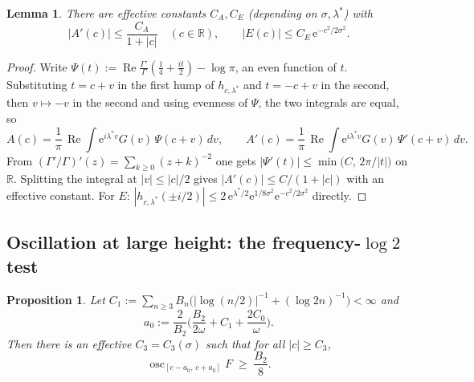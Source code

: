 \documentclass[11pt]{amsart}
\newtheorem{proposition}[theorem]{Proposition}
\newtheorem{lemma}[theorem]{Lemma}
\theoremstyle{definition}
\theoremstyle{remark}
\newcommand{\RR}{\mathbb{R}}
\newcommand{\eE}{\mathrm{e}}
\DeclareMathOperator{\Rre}{Re}
\DeclareMathOperator{\osc}{osc}
\begin{document}
\begin{lemma}\label{lem:AE}
There are effective constants $C_A,C_E$ (depending on $\sigma,\lambda^*$) with
\[
|A'(c)|\le \frac{C_A}{1+|c|}\quad(c\in\RR),\qquad
|E(c)|\le C_E\,\eE^{-c^2/2\sigma^2}.
\]
\end{lemma}

\begin{proof}
Write $\Psi(t):=\Rre\frac{\Gamma'}{\Gamma}(\tfrac14+\tfrac{it}{2})-\log\pi$, an even function of $t$. Substituting $t=c+v$ in the first hump of $h_{c,\lambda^*}$ and $t=-c+v$ in the second, then $v\mapsto-v$ in the second and using evenness of $\Psi$, the two integrals are equal, so
\[
A(c)=\frac1\pi\,\Rre\int \eE^{i\lambda^*v}G(v)\,\Psi(c+v)\,dv,
\qquad
A'(c)=\frac1\pi\,\Rre\int \eE^{i\lambda^*v}G(v)\,\Psi'(c+v)\,dv .
\]
From $(\Gamma'/\Gamma)'(z)=\sum_{k\ge0}(z+k)^{-2}$ one gets $|\Psi'(t)|\le\min\big(C,\,2\pi/|t|\big)$ on $\RR$. Splitting the integral at $|v|\le|c|/2$ gives $|A'(c)|\le C/(1+|c|)$ with an effective constant. For $E$: $|h_{c,\lambda^*}(\pm i/2)|\le2\,\eE^{\lambda^*/2}\eE^{1/8\sigma^2}\eE^{-c^2/2\sigma^2}$ directly.
\end{proof}

\subsection{Oscillation at large height: the frequency-$\log 2$ test}

\begin{proposition}\label{prop:largec}
Let $C_1:=\sum_{n\ge3}B_n\big(|\log(n/2)|^{-1}+(\log 2n)^{-1}\big)<\infty$ and
\[
a_0:=\frac{2}{B_2}\Big(\frac{B_2}{2\omega}+C_1+\frac{2C_0}{\omega}\Big).
\]
Then there is an effective $C_3=C_3(\sigma)$ such that for all $|c|\ge C_3$,
\[
\osc_{[c-a_0,\,c+a_0]}F\;\ge\;\frac{B_2}{8}.
\]
\end{proposition}
\end{document}
